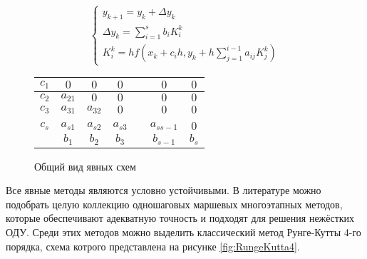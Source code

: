 \begin{figure}
    \begin{minipage}[t]{8.5cm}
        {\small
        \begin{equation*}
            \begin{cases}
                y_{k + 1} = y_k + \Delta y_k\\
                \Delta y_k = \sum\limits_{i = 1}^sb_iK_i^k\\
                K_i^k = hf(x_k + c_ih, y_k + h\sum\limits_{j = 1}^{i - 1}a_{ij}K_j^k)
            \end{cases}
        \end{equation*}
        }
    \end{minipage}
    \begin{minipage}[t]{7.5cm}
        \begin{table}    
            \begin{tabular}{|c|c|c|c|c|c|c|}
            \hline
            $c_1$ & $0$ & $0$ & $0$ & & $0$ & $0$\\
            \hline
            $c_2$ & $a_{21}$ & $0$ & $0$ & & $0$ & $0$\\
            \hline
            $c_3$ & $a_{31}$ & $a_{32}$ & $0$ & & $0$ & $0$\\
            \hline
            & & & & & &\\
            \hline
            $c_s$ & $a_{s1}$ & $a_{s2}$ & $a_{s3}$ & & $a_{ss-1}$ & $0$\\
            \hline
            & \cellcolor{lightgray} $b_1$ & \cellcolor{lightgray} $b_2$ & \cellcolor{lightgray} $b_3$ & \cellcolor{lightgray} & \cellcolor{lightgray} $b_{s-1}$ &  \cellcolor{lightgray} $b_s$\\
            \hline
            \end{tabular}
        \end{table}
    \end{minipage}
    \caption{Общий вид явных схем}
    \label{fig:Runge}
\end{figure}

Все явные методы являются условно устойчивыми.
В литературе \cite{book1} можно подобрать целую коллекцию одношаговых маршевых многоэтапных методов, которые обеспечивают адекватную точность и
подходят для решения нежёстких ОДУ. Среди этих методов можно выделить классический метод Рунге-Кутты 4-го порядка, схема котрого
представлена на
рисунке \ref{fig:RungeKutta4}.

